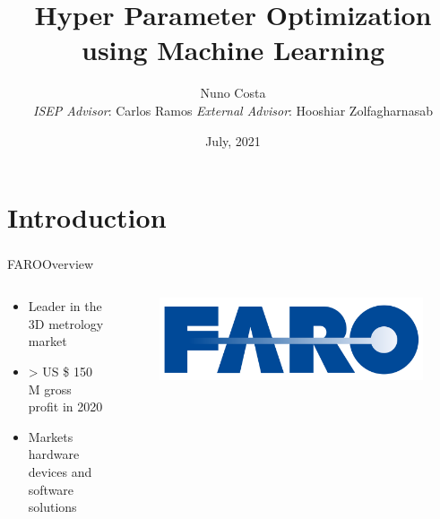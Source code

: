 \documentclass[10pt]{beamer}
\title{Hyper Parameter Optimization \newline using Machine Learning}
\date{July, 2021}
\author{{Nuno Costa} \texorpdfstring{ \\
{\textit{ISEP Advisor}: Carlos Ramos} \newline
{\textit{External Advisor}: Hooshiar Zolfagharnasab}}{}}
\institute{Polytechnic of Porto - School of Engineering (ISEP)}
\newcommand{\faro}[0]{FARO\textsuperscript{\textregistered}\space}
\begin{document}
  \maketitle
  \section{Introduction}
  \begin{frame}{\faro Overview}
    \vspace{1cm}
    \begin{columns}
      \begin{column}{0.7\textwidth}
          \begin{itemize}
            \item Leader in the 3D metrology market
            \item > US \$ 150 M gross profit in 2020
            \item Markets hardware devices and software solutions
          \end{itemize}
      \end{column}
      \begin{column}{0.3\textwidth}
        \begin{figure}
        \centering
        \includegraphics[width=\textwidth]{images/faro_logo.png}
        \end{figure}
      \end{column}
    \end{columns}
    \begin{columns}
      \begin{column}{0.30\textwidth}
        \begin{figure}
          \centering

\end{figure}
\end{column}
\end{columns}
\end{frame}
\end{document}
